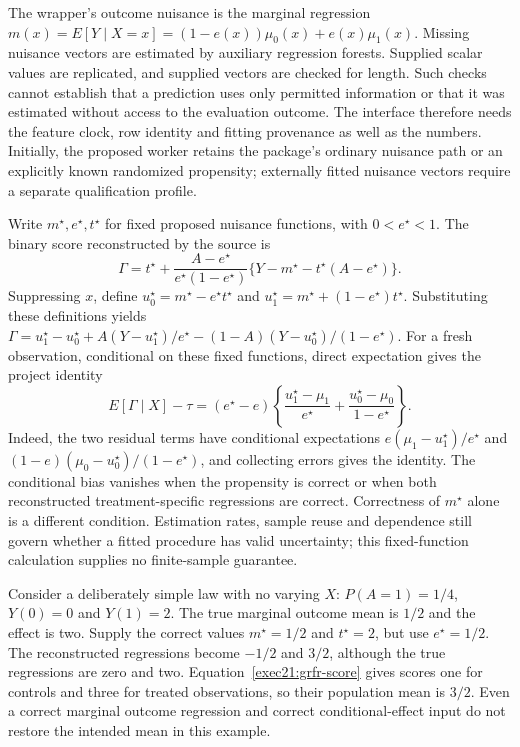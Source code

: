 The wrapper's outcome nuisance is the marginal regression $m(x)=E[Y\mid X=x]=(1-e(x))\mu_0(x)+e(x)\mu_1(x)$. Missing nuisance vectors are estimated by auxiliary regression forests. Supplied scalar values are replicated, and supplied vectors are checked for length. Such checks cannot establish that a prediction uses only permitted information or that it was estimated without access to the evaluation outcome. The interface therefore needs the feature clock, row identity and fitting provenance as well as the numbers. Initially, the proposed worker retains the package's ordinary nuisance path or an explicitly known randomized propensity; externally fitted nuisance vectors require a separate qualification profile.\citep{exec21_grf_reuse}

Write $m^\star,e^\star,t^\star$ for fixed proposed nuisance functions, with $0<e^\star<1$. The binary score reconstructed by the source is
\begin{equation}
 \Gamma=t^\star+\frac{A-e^\star}{e^\star(1-e^\star)}
       \{Y-m^\star-t^\star(A-e^\star)\}.
 \label{exec21:grfr-score}
\end{equation}
Suppressing $x$, define $u_0^\star=m^\star-e^\star t^\star$ and
$u_1^\star=m^\star+(1-e^\star)t^\star$. Substituting these definitions yields
$\Gamma=u_1^\star-u_0^\star+A(Y-u_1^\star)/e^\star
-(1-A)(Y-u_0^\star)/(1-e^\star)$. For a fresh observation, conditional on these fixed functions, direct expectation gives the project identity
\begin{equation}
 E[\Gamma\mid X]-\tau
 =(e^\star-e)\left\{\frac{u_1^\star-\mu_1}{e^\star}
                   +\frac{u_0^\star-\mu_0}{1-e^\star}\right\}.
 \label{exec21:grfr-bias}
\end{equation}
Indeed, the two residual terms have conditional expectations
$e(\mu_1-u_1^\star)/e^\star$ and
$(1-e)(\mu_0-u_0^\star)/(1-e^\star)$, and collecting errors gives the identity. The conditional bias vanishes when the propensity is correct or when both reconstructed treatment-specific regressions are correct. Correctness of $m^\star$ alone is a different condition. Estimation rates, sample reuse and dependence still govern whether a fitted procedure has valid uncertainty; this fixed-function calculation supplies no finite-sample guarantee.\citep{exec21_grf_reuse,exec21_grf_reference}

Consider a deliberately simple law with no varying $X$: $P(A=1)=1/4$, $Y(0)=0$ and $Y(1)=2$. The true marginal outcome mean is $1/2$ and the effect is two. Supply the correct values $m^\star=1/2$ and $t^\star=2$, but use $e^\star=1/2$. The reconstructed regressions become $-1/2$ and $3/2$, although the true regressions are zero and two. Equation~\eqref{exec21:grfr-score} gives scores one for controls and three for treated observations, so their population mean is $3/2$. Even a correct marginal outcome regression and correct conditional-effect input do not restore the intended mean in this example.


